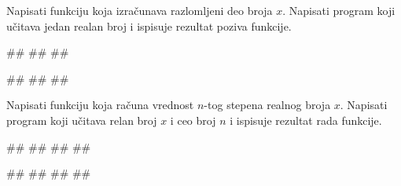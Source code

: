 \begin{Exercise}[label=p1.4_03] 
Napisati funkciju  koja
izračunava razlomljeni deo broja $x$. Napisati program koji učitava
jedan realan broj i ispisuje rezultat poziva funkcije.
 
\begin{miditest}
\begin{upotreba}{1}
#\naslovInt#
##
##
\end{upotreba}
\end{miditest}
\begin{miditest}
\begin{upotreba}{2}
#\naslovInt#
##
##
\end{upotreba}
\end{miditest}
\end{Exercise}
\ifresenja 
\begin{Answer}[ref=p1.4_03]
\end{Answer} 
\fi

\begin{Exercise}[label=v1.4_02] 
Napisati funkciju  koja računa
vrednost $n$-tog stepena realnog broja $x$. Napisati program koji
učitava relan broj $x$ i ceo broj $n$ i ispisuje rezultat rada
funkcije.

\begin{miditest}
\begin{upotreba}{1}
#\naslovInt#
##
##
##
\end{upotreba}
\end{miditest}
\begin{miditest}
\begin{upotreba}{2}
#\naslovInt#
##
##
##
\end{upotreba}
\end{miditest}

\end{Exercise}
\ifresenja 
\begin{Answer}[ref=v1.4_02]
\end{Answer} 
\fi

